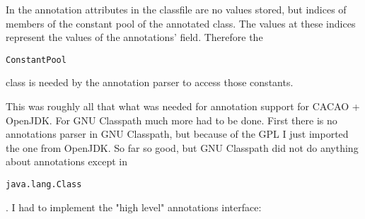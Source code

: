 \documentclass[a4paper, 10pt, titlepage]{scrartcl} %
\begin{document}
In the annotation attributes in the classfile are no values stored, but indices
of members of the constant pool of the annotated class. The values at these
indices represent the values of the annotations' field. Therefore the
\begin{scriptsize}\verb|ConstantPool|\end{scriptsize} class is needed by the annotation parser to access those
constants.

This was roughly all that what was needed for annotation support for CACAO +
OpenJDK. For GNU Classpath much more had to be done. First there is no
annotations parser in GNU Classpath, but because of the GPL I just imported the
one from OpenJDK. So far so good, but GNU Classpath did not do anything about
annotations except in \begin{scriptsize}\verb|java|\hspace{0.0pt}\verb|.|\hspace{0.0pt}\verb|lang|\hspace{0.0pt}\verb|.|\hspace{0.0pt}\verb|Class|\end{scriptsize}. I had to implement the "high
level" annotations interface:
\end{document}
